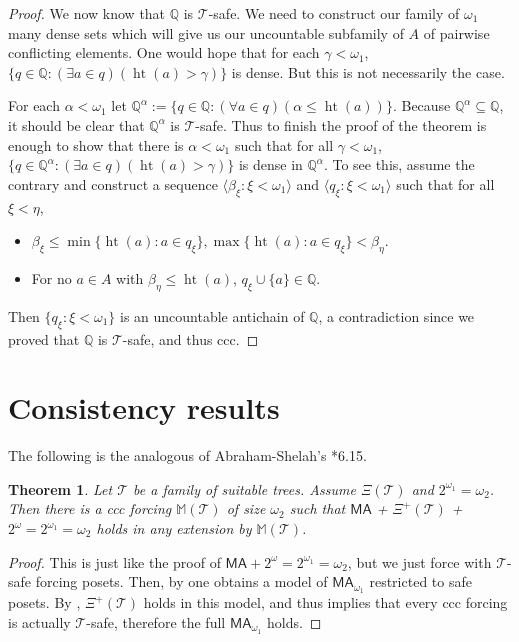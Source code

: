 \documentclass[10pt,a4paper]{amsart}
\newtheorem{theorem}{Theorem}[section]
\theoremstyle{definition}
\newcommand{\Q}{\mathbb{Q}}
\newcommand{\seb}{\subseteq}
\newcommand{\tup}[1]{\langle#1\rangle}
\newcommand{\MA}{\textsf{MA}}
\newcommand{\1}{\mathbf{1}}
\newcommand{\M}{\mathbb{M}}
\newcommand{\T}{\mathcal{T}}
\newcommand{\prop}{\Xi}
\newcommand{\propp}{\prop^{+}}
\DeclareMathOperator{\hht}{ht}
\begin{document}
\begin{proof}
  We now know that $\Q$ is $\T$-safe. We need to construct
  our family of $\omega_{1}$ many dense sets which will give us
  our uncountable subfamily of $A$ of pairwise conflicting elements.
  One would hope that
  for each $\gamma < \omega_{1}$,
  $\{q \in \Q : (\exists a \in q)(\hht(a) > \gamma)\}$ is dense. But this
  is not necessarily the case.

  For each $\alpha < \omega_{1}$ let
  $\Q^{\alpha} := \{q \in \Q : (\forall a \in q)(\alpha \le \hht(a))\}$.
  Because $\Q^{\alpha} \seb \Q$, it should be clear that $\Q^{\alpha}$
  is $\T$-safe. Thus to finish the proof of the theorem
  is enough to show that there is $\alpha < \omega_{1}$ such that
  for all $\gamma < \omega_{1}$,
  $\{q \in \Q^{\alpha} : (\exists a \in q)(\hht(a) > \gamma)\}$
  is dense in $\Q^{\alpha}$. To see this, assume the contrary
  and construct
  a sequence $\tup{\beta_{\xi} : \xi < \omega_{1}}$ and
  $\tup{q_{\xi} : \xi < \omega_{1}}$ such that for all $\xi < \eta$,
  \begin{itemize}
    \item $\beta_{\xi} \le \min\{\hht(a) : a \in q_{\xi}\},
    \max \{\hht(a) : a \in q_{\xi}\} < \beta_{\eta}$.
    \item For no $a \in A$ with $\beta_{\eta} \le \hht(a)$,
    $q_{\xi} \cup \{a\} \in \Q$. 
  \end{itemize}
  Then $\{q_{\xi} : \xi < \omega_{1}\}$ is an uncountable antichain
  of $\Q$, a contradiction since we proved that $\Q$ is $\T$-safe,
  and thus ccc.
\end{proof}


\section{Consistency results}

The following is the analogous of Abraham-Shelah's \cite{ShelahAbraham}*{6.15}.

\begin{theorem}\label{thm:ma+psi}
  Let $\T$ be a family of suitable trees. Assume
  $\prop(\T)$ and $2^{\omega_{1}} = \omega_{2}$.
  Then
  there is a ccc forcing $\M(\T)$ of size $\omega_{2}$
  such that
  $\MA$ + $\propp(\T)$ + $2^{\omega} = 2^{\omega_{1}} = \omega_{2}$
  holds in any extension by
  $\M(\T)$.
\end{theorem}

\begin{proof}
  This is just like the proof of $\MA + 2^{\omega} = 2^{\omega_{1}} = \omega_{2}$,
  but we just force with $\T$-safe forcing posets. Then, by
  one obtains a model
  of $\MA_{\omega_{1}}$ restricted to safe posets. By ,
  $\propp(\T)$ holds in this model,
  and thus  implies that every
  ccc forcing is actually $\T$-safe, therefore the full
  $\MA_{\omega_{1}}$ holds.
\end{proof}
\end{document}
